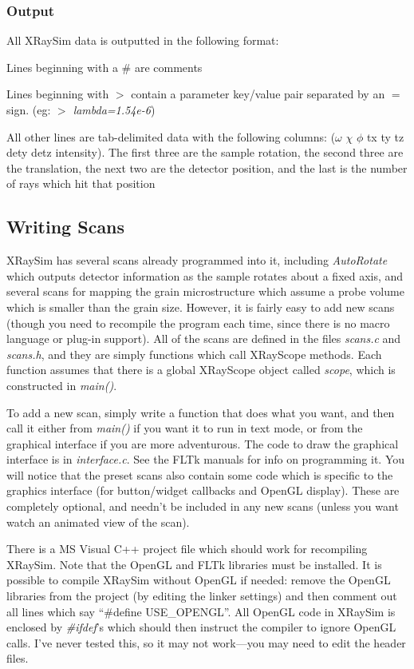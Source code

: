\documentclass{article}
\begin{document}
\subsubsection{Output}

All XRaySim data is outputted in the following format:

	\begin{list}{-}{}
		\item Lines beginning with a \# are comments
		\item Lines beginning with $>$ contain a parameter key/value
		pair separated by an $=$ sign. (eg: {\em $>$ lambda=1.54e-6})
		\item All other lines are tab-delimited data with the
		following columns: ($\omega$  $\chi$  $\phi$  tx  ty  tz dety
		detz intensity).  The first three are the sample rotation, the
		second three are the translation, the next two are the
		detector position, and the last is the number of rays which
		hit that position
	\end{list}


\subsection{Writing Scans}

	XRaySim has several scans already programmed into it, including
	{\em AutoRotate} which outputs detector information as the sample
	rotates about a fixed axis, and several scans for mapping the
	grain microstructure which assume a probe volume which is smaller
	than the grain size.  However, it is fairly easy to add new scans
	(though you need to recompile the program each time, since there
	is no macro language or plug-in support).  All of the scans are
	defined in the files {\em scans.c} and {\em scans.h}, and they are
	simply functions which call XRayScope methods.  Each function
	assumes that there is a global XRayScope object called {\em
	scope}, which is constructed in {\em main()}.
	
	To add a new scan, simply write a function that does what you
	want, and then call it either from {\em main()} if you want it to
	run in text mode, or from the graphical interface if you are more
	adventurous. The code to draw the graphical interface is in {\em
	interface.c}. See the FLTk manuals for info on programming it.
	You will notice that the preset scans also contain some code which
	is specific to the graphics interface (for button/widget callbacks
	and OpenGL display).  These are completely optional, and needn't
	be included in any new scans (unless you want watch an animated
	view of the scan).

	There is a MS Visual C++ project file which should work for
	recompiling XRaySim.  Note that the OpenGL and FLTk libraries must
	be installed.  It is possible to compile XRaySim without OpenGL if
	needed: remove the OpenGL libraries from the project (by editing
	the linker settings) and then comment out all lines which say
	``\#define USE\_OPENGL''.  All OpenGL code in XRaySim is enclosed by
	{\em \#ifdef}'s which should then instruct the compiler to ignore
	OpenGL calls. I've never tested this, so it may not work---you may
	need to edit the header files.
\end{document}
